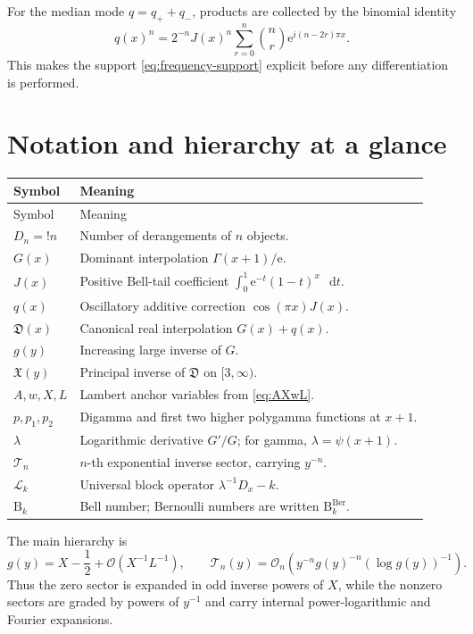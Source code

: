 \documentclass[11pt,oneside]{article}
\theoremstyle{plain}
\theoremstyle{definition}
\theoremstyle{remark}
\newcommand{\ee}{\mathrm{e}}
\newcommand{\dd}{\mathop{}\!\mathrm{d}}
\newcommand{\Dfrak}{\mathfrak{D}}
\newcommand{\Xfrak}{\mathfrak{X}}
\newcommand{\Tcal}{\mathcal{T}}
\newcommand{\Lcal}{\mathcal{L}}
\newcommand{\Bell}{\mathrm{B}}
\newcommand{\bigO}{\mathcal{O}}
\begin{document}
For the median mode \(q=q_++q_-\), products are collected by the binomial
identity
\begin{equation}
 q(x)^n=2^{-n}J(x)^n
 \sum_{r=0}^{n}\binom{n}{r}\ee^{i(n-2r)\pi x}.
 \label{eq:q-power-Fourier}
\end{equation}
This makes the support \eqref{eq:frequency-support} explicit before any
differentiation is performed.

\section{Notation and hierarchy at a glance}
\label{app:notation}

\begin{longtable}{@{}p{}p{}@{}}
\toprule
Symbol & Meaning \\
\midrule
\endfirsthead
\toprule
Symbol & Meaning \\
\midrule
\endhead
\(D_n={!n}\) & Number of derangements of \(n\) objects. \\
\(G(x)\) & Dominant interpolation \(\Gamma(x+1)/\ee\). \\
\(J(x)\) & Positive Bell-tail coefficient
\(\int_0^1\ee^{-t}(1-t)^x\,\dd t\). \\
\(q(x)\) & Oscillatory additive correction \(\cos(\pi x)J(x)\). \\
\(\Dfrak(x)\) & Canonical real interpolation \(G(x)+q(x)\). \\
\(g(y)\) & Increasing large inverse of \(G\). \\
\(\Xfrak(y)\) & Principal inverse of \(\Dfrak\) on \([3,\infty)\). \\
\(A,w,X,L\) & Lambert anchor variables from \eqref{eq:AXwL}. \\
\(p,p_1,p_2\) & Digamma and first two higher polygamma functions at \(x+1\). \\
\(\lambda\) & Logarithmic derivative \(G'/G\); for gamma, \(\lambda=\psi(x+1)\). \\
\(\Tcal_n\) & \(n\)-th exponential inverse sector, carrying \(y^{-n}\). \\
\(\Lcal_k\) & Universal block operator \(\lambda^{-1}D_x-k\). \\
\(\Bell_k\) & Bell number; Bernoulli numbers are written
\(\Bell_k^{\mathrm{Ber}}\). \\
\bottomrule
\end{longtable}

The main hierarchy is
\begin{equation}
 g(y)=X-\frac12+\bigO(X^{-1}L^{-1}),
 \qquad
 \Tcal_n(y)=\bigO_n\!\left(
 y^{-n}g(y)^{-n}(\log g(y))^{-1}
 \right).
 \label{eq:hierarchy-summary}
\end{equation}
Thus the zero sector is expanded in odd inverse powers of \(X\), while the
nonzero sectors are graded by powers of \(y^{-1}\) and carry internal
power-logarithmic and Fourier expansions.
\end{document}
